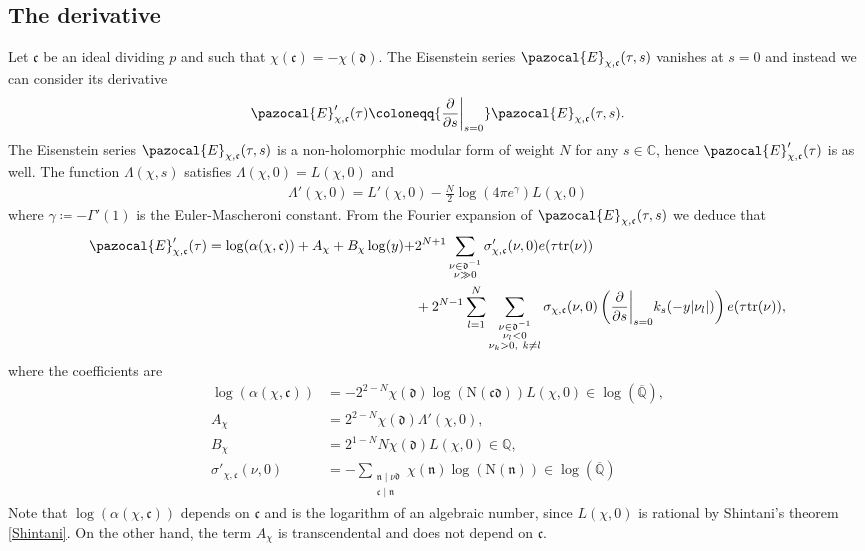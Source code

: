 \documentclass[twoside,a4paper,10pt]{article} %
\newcommand{\dds}{\restr{\frac{\partial}{\partial s}}{s=0}}
\newcommand{\8}{\infty}
\newcommand{\Qbar}{\overline{\Q}}
\newcommand{\Q}{\mathbb{Q}}
\newcommand{\C}{\mathbb{C}}
\newcommand{\nfrak}{\mathfrak{n}}
\newcommand{\dfrak}{\mathfrak{d}}
\newcommand{\cfrak}{\mathfrak{c}}
\newcommand{\tr}{\mathrm{tr}}
\newcommand{\N}{\mathrm{N}}
\newcommand{\Ecal}{\pazocal{E}}
\newcommand\restr[2]{{%
  \left.\kern-\nulldelimiterspace %
  #1 %
  \vphantom{\big|} %
  \right|_{#2} %
  }}
\theoremstyle{mytheoremstyle}
\theoremstyle{remark}
\numberwithin{equation}{section}
\begin{document}
\subsection{The derivative} Let $\cfrak$ be an ideal dividing $p$ and such that $\chi(\cfrak)=-\chi(\dfrak)$. The Eisenstein series $\Ecal_{\chi,\cfrak}(\tau,s)$ vanishes at $s=0$ and instead we can consider its derivative
\begin{align}
\Ecal'_{\chi,\cfrak}(\tau) \coloneqq \dds \Ecal_{\chi,\cfrak}(\tau,s).
\end{align}
The Eisenstein series $\Ecal_{\chi,\cfrak}(\tau,s)$ is a non-holomorphic modular form of weight $N$ for any $s \in \C$, hence $\Ecal'_{\chi,\cfrak}(\tau)$ is as well. The function $\Lambda(\chi,s)$ satisfies $\Lambda(\chi,0)=L(\chi,0)$ and
\begin{align}
\Lambda'(\chi,0)=L'(\chi,0)-\frac{N}{2}\log(4 \pi e^\gamma) L(\chi,0)
\end{align}
where $\gamma \coloneqq -\Gamma'(1)$ is the Euler-Mascheroni constant. From the Fourier expansion of $\Ecal_{\chi,\cfrak}(\tau,s)$ we deduce that 
\begin{align}\label{fourier expansion derivative}
\Ecal'_{\chi,\cfrak}(\tau)= \log(\alpha(\chi,\cfrak))+A_{\chi}+B_{\chi}\log(y)+& 2^{N+1}\sum_{\substack{\nu \in \dfrak^{-1} \\ \nu \gg 0}}\sigma'_{\chi,\cfrak}(\nu,0)e(\tau\tr(\nu)) \\
& + 2^{N-1}\sum_{l=1}^N\sum_{\substack{\nu \in \dfrak^{-1} \\ \nu_l<0 \\ \nu_k>0, \ k \neq l}}\sigma_{\chi,\cfrak}(\nu,0) \left ( \dds k_s(-y \vert \nu_l \vert) \right )e(\tau\tr(\nu)),
\end{align}  where the coefficients are
\begin{align}
\log(\alpha(\chi,\cfrak)) & = -2^{2-N}\chi(\dfrak) \log(\N(\cfrak \dfrak))L(\chi,0) \in \log(\Qbar),\\
A_{\chi}  & = 2^{2-N}\chi(\dfrak)\Lambda'(\chi,0), \\
B_{\chi} & = 2^{1-N}N \chi(\dfrak)  L(\chi,0) \in \Q, \\
\sigma'_{\chi,\cfrak}(\nu,0) & = - \sum_{\substack{ \nfrak \mid \nu \dfrak \\ \cfrak \mid \nfrak}} \chi(\nfrak)\log(\N(\nfrak)) \in \log(\Qbar)
\end{align}
Note that $\log(\alpha(\chi,\cfrak))$ depends on $\cfrak$ and is the logarithm of an algebraic number, since $L(\chi,0)$ is rational by Shintani's theorem \ref{Shintani}. On the other hand, the term $A_{\chi}$ is transcendental and does not depend on $\cfrak$.
\end{document}
